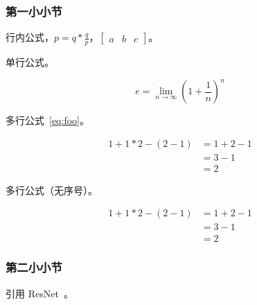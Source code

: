 \subsubsection{第一小小节}

行内公式，$p = q * \frac{q}{p}$，$\begin{bmatrix} a & b & c \end{bmatrix}$。

单行公式。

\begin{equation}
    e = \lim_{n\to \infty} \left(1 + \frac{1}{n}\right)^n
\end{equation}

多行公式~\ref{eq:foo}。

\begin{equation}
    \begin{aligned}
        1+ 1*2 - (2-1) & = 1+ 2 - 1 \\
                       & = 3-1      \\
                       & = 2
    \end{aligned}
    \label{eq:foo}
\end{equation}

多行公式（无序号）。

\begin{equation*}
    \begin{aligned}
        1+ 1*2 - (2-1) & = 1+ 2 - 1 \\
                       & = 3-1      \\
                       & = 2
    \end{aligned}
\end{equation*}

\subsubsection{第二小小节}

引用 ResNet~\cite{he2016deep}。

